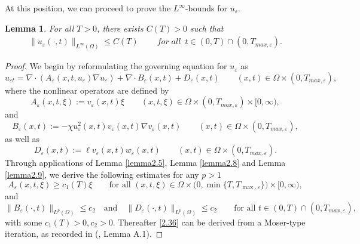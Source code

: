 \documentclass[12pt]{article}
\theoremstyle{plain}
\newtheorem{lemma}{Lemma}[section]
\theoremstyle{definition}
\numberwithin{equation}{section}
\begin{document}
At this position, we can  proceed to prove  the $L^\infty$-bounds for $u_{\varepsilon}$.
\begin{lemma}\label{lemma2.10}
For all $T>0$,  there exists
$C(T)>0$
 such that
\begin{align}\label{2.36}
   \|u_{\varepsilon}(\cdot,t)\|_{L^{\infty}(\Omega)}\leq C( T) ~\qquad for\; all\; ~t\in (0,T)\cap(0,T_{max,\varepsilon}).
\end{align}
\end{lemma}
\begin{proof}
We begin by reformulating the governing equation for $u_\varepsilon$ as
$$u_{\varepsilon t}=\nabla\cdot\left(A_{\varepsilon}(x,t,u_{\varepsilon})\nabla u_{\varepsilon}\right)+\nabla\cdot B_{\varepsilon}(x,t)+D_{\varepsilon}(x,t) \qquad(x,t)\in\Omega\times(0,T_{max,\varepsilon}),$$
where the nonlinear operators are defined by
$$A_{\varepsilon}(x,t,\xi):=v_{\varepsilon}(x,t)\xi \qquad(x,t,\xi)\in\Omega\times (0,T_{max,\varepsilon})\times[0,\infty),$$
and
$$B_{\varepsilon}(x,t):=-\chi u_{\varepsilon}^{2}(x,t)v_{\varepsilon}(x,t)\nabla v_{\varepsilon}(x,t)\qquad(x,t)\in\Omega\times(0,T_{max,\varepsilon}),$$
as well as
$$ D_{\varepsilon}(x,t):=\ell v_{\varepsilon}(x,t)w_{\varepsilon}(x,t) \qquad(x,t)\in\Omega\times(0,T_{max,\varepsilon}).$$
Through applications of Lemma \ref{lemma2.5}, Lemma \ref{lemma2.8} and Lemma \ref{lemma2.9}, we derive the following estimates for any $p > 1$
$$A_{\varepsilon}(x,t,\xi)\geq c_{1}(T)\xi\qquad\text{for all }(x,t,\xi)\in\Omega\times \big(0,\min\{T,T_{\max,\varepsilon}\}\big)\times[0,\infty),$$
and
$$\|B_{\varepsilon}(\cdot,t)\|_{L^{p}(\Omega)}\leq c_{2}\quad\text{and}\quad\|D_{\varepsilon}(\cdot,t)\|_{L^{p}(\Omega)}\leq c_2\qquad\text{for all }t\in(0,T)\cap(0,T_{max,\varepsilon}),$$
with some $c_1(T)>0,c_2>0$. Thereafter  \eqref{2.36}  can be derived from  a Moser-type iteration, as recorded in (\cite{TaoW}, Lemma A.1).
\end{proof}
\end{document}
